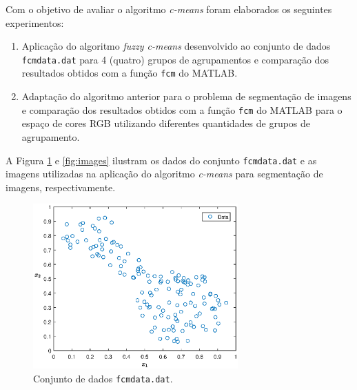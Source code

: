 \documentclass[12pt,a4paper]{article}
\numberwithin{equation}{section}
\begin{document}
Com o objetivo de avaliar o algoritmo \textit{c-means} foram elaborados os seguintes experimentos:

\begin{enumerate}
	\item Aplicação do algoritmo \textit{fuzzy c-means} desenvolvido ao conjunto de dados \texttt{fcmdata.dat} para 4 (quatro) grupos de agrupamentos e comparação dos resultados obtidos com a função \texttt{fcm} do MATLAB.
	\item Adaptação do algoritmo anterior para o problema de segmentação de imagens e comparação dos resultados obtidos com a função \texttt{fcm} do MATLAB para o espaço de cores RGB utilizando diferentes quantidades de grupos de agrupamento.
\end{enumerate}

A Figura \ref{fig:fcmdata} e \ref{fig:images} ilustram os dados do conjunto \texttt{fcmdata.dat} e as imagens utilizadas na aplicação do algoritmo \textit{c-means} para segmentação de imagens, respectivamente.

\begin{figure}[ht!]
	\centering
	\includegraphics[width=0.7\textwidth]{figures/data.eps}
	\caption{Conjunto de dados \texttt{fcmdata.dat}.}
	\label{fig:fcmdata}
\end{figure}
\end{document}

